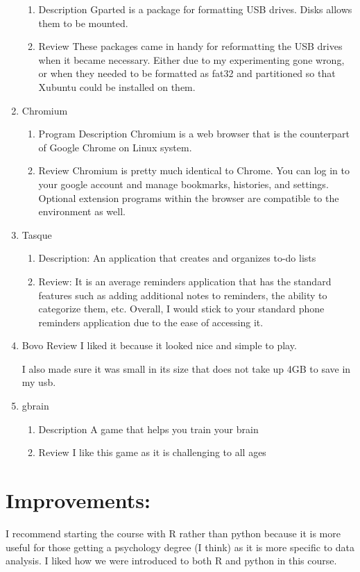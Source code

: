 \documentclass{article}
\begin{document}
\begin{enumerate}
\label{sec:orgaf7d548}
\begin{enumerate}
\item Description
\label{sec:orgb377ab4}
Gparted is a package for formatting USB drives. Disks allows them to be mounted.
\item Review
\label{sec:orgbe99df9}
These packages came in handy for reformatting the USB drives when it became necessary. Either due to my experimenting gone wrong, or when they needed to be formatted as fat32 and partitioned so that Xubuntu could be installed on them.
\end{enumerate}
\item Chromium
\label{sec:org00b53a2}
\begin{enumerate}
\item Program Description
\label{sec:org3b8507d}
Chromium is a web browser that is the counterpart of Google Chrome on Linux system.
\item Review
\label{sec:org6b6d7c1}
Chromium is pretty much identical to Chrome. You can log in to your google account and manage bookmarks, histories, and settings. Optional extension programs within the browser are compatible to the environment as well.
\end{enumerate}
\item Tasque
\label{sec:orgd0d8ce1}
\begin{enumerate}
\item Description:
\label{sec:orgadf80c1}
An application that creates and organizes to-do lists 
\item Review:
\label{sec:orgc8278b2}
It is an average reminders application that has the standard features such as adding additional notes to reminders, the ability to categorize them, etc. Overall, I would stick to your standard phone reminders application due to the ease of accessing it.
\end{enumerate}
\item Bovo Review
\label{sec:org3ef029d}
I liked it because it looked nice and simple to play. 

I also made sure it was small in its size that does not take up 4GB to save in my usb.
\item gbrain
\label{sec:org2351417}
\begin{enumerate}
\item Description
\label{sec:org6272335}
A game that helps you train your brain
\item Review
\label{sec:org19d51c1}
I like this game as it is challenging to all ages
\end{enumerate}
\end{enumerate}

\section{Improvements:}
\label{sec:orgb7ce5a8}
I recommend starting the course with R rather than python because it is more useful for those getting a psychology degree (I think) as it is more specific to data analysis. I liked how we were introduced to both R and python in this course. 
\end{document}
